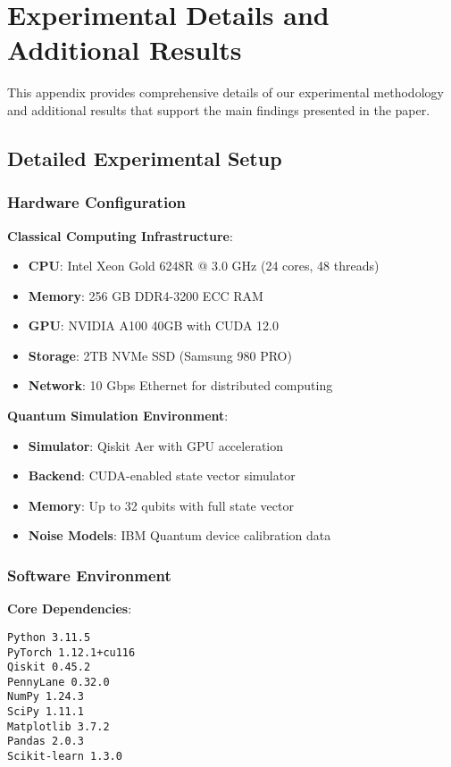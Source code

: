 \section{Experimental Details and Additional Results}
\label{app:experiments}

This appendix provides comprehensive details of our experimental methodology and additional results that support the main findings presented in the paper.

\subsection{Detailed Experimental Setup}

\subsubsection{Hardware Configuration}

\textbf{Classical Computing Infrastructure}:
\begin{itemize}
    \item \textbf{CPU}: Intel Xeon Gold 6248R @ 3.0 GHz (24 cores, 48 threads)
    \item \textbf{Memory}: 256 GB DDR4-3200 ECC RAM
    \item \textbf{GPU}: NVIDIA A100 40GB with CUDA 12.0
    \item \textbf{Storage}: 2TB NVMe SSD (Samsung 980 PRO)
    \item \textbf{Network}: 10 Gbps Ethernet for distributed computing
\end{itemize}

\textbf{Quantum Simulation Environment}:
\begin{itemize}
    \item \textbf{Simulator}: Qiskit Aer with GPU acceleration
    \item \textbf{Backend}: CUDA-enabled state vector simulator
    \item \textbf{Memory}: Up to 32 qubits with full state vector
    \item \textbf{Noise Models}: IBM Quantum device calibration data
\end{itemize}

\subsubsection{Software Environment}

\textbf{Core Dependencies}:
\begin{verbatim}
Python 3.11.5
PyTorch 1.12.1+cu116
Qiskit 0.45.2
PennyLane 0.32.0
NumPy 1.24.3
SciPy 1.11.1
Matplotlib 3.7.2
Pandas 2.0.3
Scikit-learn 1.3.0
\end{verbatim}

